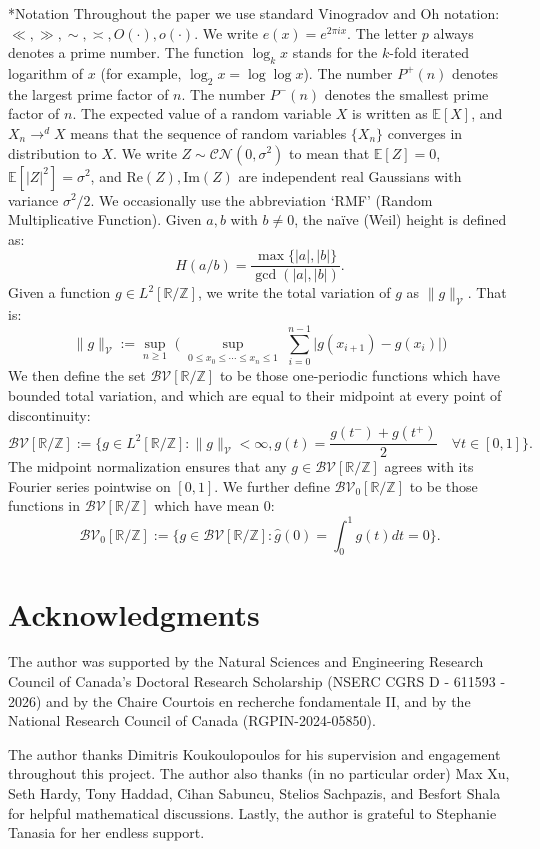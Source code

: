 \documentclass[12pt]{amsart}
\makeatletter
\renewcommand\subsection{\@startsection{subsection}{2}%
	\z@{1\linespacing\@plus1\linespacing}{\linespacing}%
	{\normalfont\bfseries\centering}}
\renewcommand{\leq}{\leqslant}
\renewcommand{\geq}{\geqslant}
\numberwithin{equation}{section}
\theoremstyle{plain}
\theoremstyle{definition}
\newcommand{\Z}{\mathbb{Z}}
\newcommand{\R}{\mathbb{R}}
\newcommand{\E}{\mathbb{E}}
\newcommand{\CB}{\mathcal{B}}
\newcommand{\CC}{\mathcal{C}}
\newcommand{\CN}{\mathcal{N}}
\newcommand{\CV}{\mathcal{V}}
\renewcommand{\Re}{\mathrm{Re}}
\renewcommand{\Im}{\mathrm{Im}}
\makeatother
\begin{document}
	\subsection*{Notation} Throughout the paper we use standard Vinogradov and Oh notation: $\ll,\gg,\sim,\asymp,O(\cdot),o(\cdot)$. We write $e(x) = e^{2 \pi i x}$. The letter $p$ always denotes a prime number. The function $\log_kx$ stands for the $k$-fold iterated logarithm of $x$ (for example, $\log_2 x = \log \log x$). The number $P^+(n)$ denotes the largest prime factor of $n$. The number $P^-(n)$ denotes the smallest prime factor of $n$. The expected value of a random variable $X$ is written as $\E[X]$, and $X_n \to^d X$ means that the sequence of random variables $\{X_n\}$ converges in distribution to $X$. We write $Z\sim \CC\CN(0,\sigma^2)$ to mean that $\E [Z]=0$, $\E [|Z|^2]=\sigma^2$, and $\Re(Z),\Im(Z)$ are independent real Gaussians with variance $\sigma^2/2$. We occasionally use the abbreviation `RMF' (Random Multiplicative Function). 
	Given $a,b$ with $b \ne 0$, the na\"ive (Weil) height is defined as:
	$$H(a/b) = \frac{\max \{|a|,|b|\}}{\gcd(|a|,|b|)}.$$
	Given a function $g \in L^2[\R/\Z]$, we write the total variation of $g$ as $\|g\|_{\CV}$. That is:
	$$\|g\|_{\CV} := \sup_{n \geq 1}\;\bigg(\sup_{\substack{0 \leq x_0 \leq \cdots \leq x_n \leq 1}} \sum_{i = 0}^{n-1} \big|g(x_{i+1})-g(x_i) \big|\bigg)$$
	We then define the set $\CB\CV[\R/\Z]$ to be those one-periodic functions which have bounded total variation, and which are equal to their midpoint at every point of discontinuity:
	$$\CB\CV[\R/\Z] := \bigg\{ g \in L^2[\R/\Z] : \|g\|_{\CV}<\infty, g(t) = \frac{g(t^-)+g(t^+)}{2} \quad \forall t \in [0,1] \bigg\}.$$
	The midpoint normalization ensures that any $g \in \CB\CV[\R/\Z]$ agrees with its Fourier series pointwise on $[0,1]$. We further define $\CB\CV_0[\R/\Z]$ to be those functions in $\CB\CV[\R/\Z]$ which have mean $0$:
	$$\CB\CV_0[\R/\Z] := \bigg\{ g \in \CB\CV[\R/\Z] : \hat{g}(0) = \int_0^1 g(t)dt = 0 \bigg\}.$$
	\section*{Acknowledgments}
	The author was supported by the Natural Sciences and Engineering Research Council of Canada's Doctoral Research Scholarship (NSERC CGRS D - 611593 - 2026) and by the Chaire Courtois en recherche fondamentale II, and by the National Research Council of Canada (RGPIN-2024-05850).
	
	The author thanks Dimitris Koukoulopoulos for his supervision and engagement throughout this project. The author also thanks (in no particular order) Max Xu, Seth Hardy, Tony Haddad, Cihan Sabuncu, Stelios Sachpazis, and Besfort Shala for helpful mathematical discussions. Lastly, the author is grateful to Stephanie Tanasia for her endless support.
	
\end{document}
